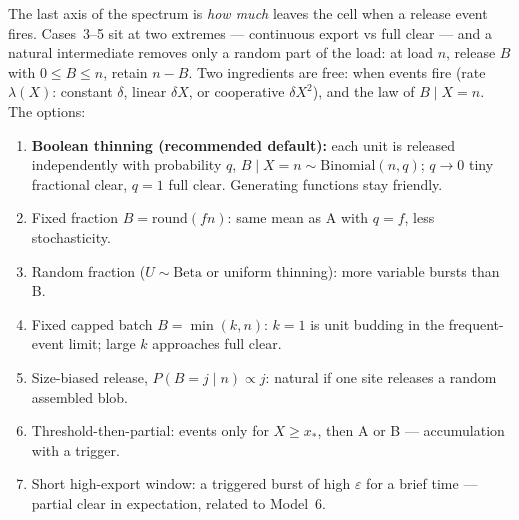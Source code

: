 The last axis of the spectrum is \emph{how much} leaves the cell when a
release event fires. Cases~3--5 sit at two extremes --- continuous export
vs full clear --- and a natural intermediate removes only a random part of
the load: at load $n$, release $B$ with $0\le B\le n$, retain $n-B$. Two
ingredients are free: when events fire (rate $\lambda(X)$: constant
$\delta$, linear $\delta X$, or cooperative $\delta X^2$), and the law of
$B\mid X=n$. The options:
\begin{enumerate}
\item[A.] \textbf{Boolean thinning (recommended default):} each unit is
released independently with probability $q$,
$B\mid X=n\sim\mathrm{Binomial}(n,q)$; $q\to0$ tiny fractional clear,
$q=1$ full clear. Generating functions stay friendly.
\item[B.] Fixed fraction $B=\mathrm{round}(fn)$: same mean as A with
$q=f$, less stochasticity.
\item[C.] Random fraction ($U\sim\mathrm{Beta}$ or uniform thinning): more
variable bursts than B.
\item[D.] Fixed capped batch $B=\min(k,n)$: $k=1$ is unit budding in the
frequent-event limit; large $k$ approaches full clear.
\item[E.] Size-biased release, $P(B=j\mid n)\propto j$: natural if one site
releases a random assembled blob.
\item[F.] Threshold-then-partial: events only for $X\ge x_*$, then A or B
--- accumulation with a trigger.
\item[G.] Short high-export window: a triggered burst of high $\varepsilon$
for a brief time --- partial clear in expectation, related to Model~6.
\end{enumerate}

